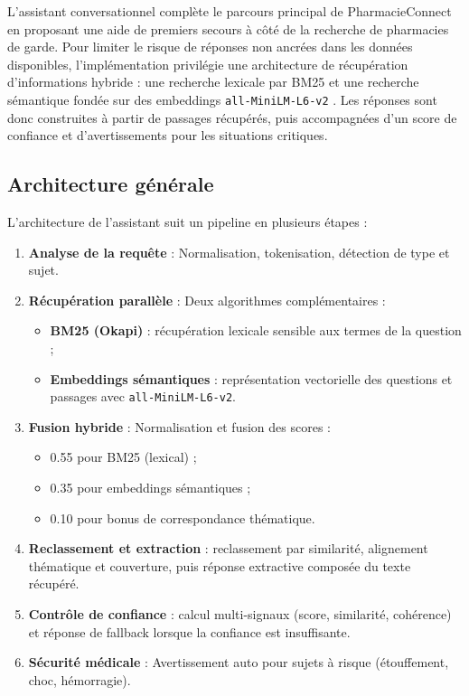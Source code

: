 L'assistant conversationnel complète le parcours principal de PharmacieConnect en proposant une aide de
premiers secours à côté de la recherche de pharmacies de garde. Pour limiter le risque de réponses non
ancrées dans les données disponibles, l'implémentation privilégie une architecture de récupération
d'informations hybride : une recherche lexicale par BM25 \cite{robertson_okapi_trec3} et une recherche
sémantique fondée sur des embeddings \texttt{all-MiniLM-L6-v2} \cite{sentence_transformers_minilm}. Les
réponses sont donc construites à partir de passages récupérés, puis accompagnées d'un score de confiance
et d'avertissements pour les situations critiques.

\subsection{Architecture générale}

L'architecture de l'assistant suit un pipeline en plusieurs étapes :

\begin{enumerate}
    \item \textbf{Analyse de la requête} : Normalisation, tokenisation, détection de type et sujet.
    \item \textbf{Récupération parallèle} : Deux algorithmes complémentaires :
        \begin{itemize}
            \item \textbf{BM25 (Okapi)} : récupération lexicale sensible aux termes de la question ;
            \item \textbf{Embeddings sémantiques} : représentation vectorielle des questions et passages avec \texttt{all-MiniLM-L6-v2}.
        \end{itemize}
    \item \textbf{Fusion hybride} : Normalisation et fusion des scores :
        \begin{itemize}
            \item 0.55 pour BM25 (lexical) ;
            \item 0.35 pour embeddings sémantiques ;
            \item 0.10 pour bonus de correspondance thématique.
        \end{itemize}
    \item \textbf{Reclassement et extraction} : reclassement par similarité, alignement thématique et couverture, puis réponse extractive composée du texte récupéré.
    \item \textbf{Contrôle de confiance} : calcul multi-signaux (score, similarité, cohérence) et réponse de fallback lorsque la confiance est insuffisante.
    \item \textbf{Sécurité médicale} : Avertissement auto pour sujets à risque (étouffement, choc, hémorragie).
\end{enumerate}

